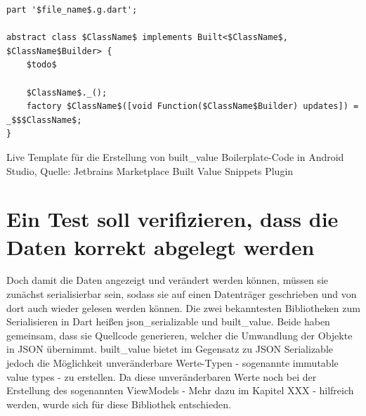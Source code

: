 

\begin{listing}[h]
\begin{verbatim}
part '$file_name$.g.dart';

abstract class $ClassName$ implements Built<$ClassName$, $ClassName$Builder> {
    $todo$
    
    $ClassName$._();
    factory $ClassName$([void Function($ClassName$Builder) updates]) = _$$$ClassName$;
}
\end{verbatim} 
\caption[built_value Live Template]{Live Template für die Erstellung von built_value Boilerplate-Code in Android Studio, Quelle: Jetbrains Marketplace Built Value Snippets Plugin}
\label{lst:BuiltValueLiveTemplate}
\end{listing}


\section{Ein Test soll verifizieren, dass die Daten korrekt abgelegt werden}



Doch damit die Daten angezeigt und verändert werden können, müssen sie zunächst serialisierbar sein, sodass sie auf einen Datenträger geschrieben und von dort auch wieder gelesen werden können. 
Die zwei bekanntesten Bibliotheken zum Serialisieren in Dart heißen json_serializable und built_value.
Beide haben gemeinsam, dass sie Quellcode generieren, welcher die Umwandlung der Objekte in JSON übernimmt.
built_value bietet im Gegensatz zu JSON Serializable jedoch die Möglichkeit unveränderbare Werte-Typen -  sogenannte immutable value types -  zu erstellen. Da diese  unveränderbaren Werte noch bei der Erstellung des sogenannten ViewModels -  Mehr dazu im Kapitel XXX - hilfreich werden, wurde sich für diese Bibliothek entschieden.

